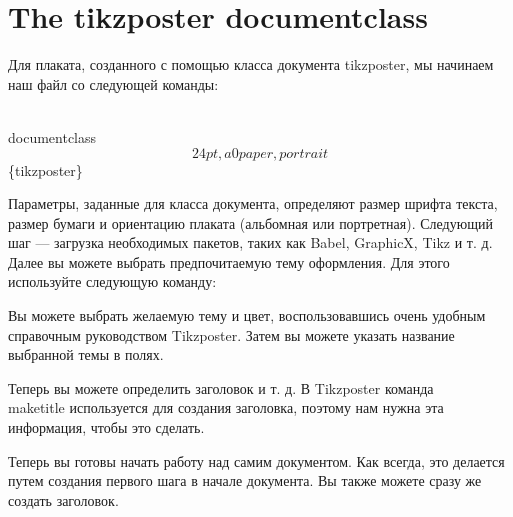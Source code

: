 \documentclass{article}
\begin{document}
  \section{The tikzposter documentclass}
  \label{sec:tikzposter}

  Для плаката, созданного с помощью класса документа tikzposter, мы начинаем наш файл со следующей команды:

  \\documentclass\[24pt, a0paper, portrait\]\{tikzposter\}


  Параметры, заданные для класса документа, определяют размер шрифта текста, размер бумаги и ориентацию плаката (альбомная или портретная).
Следующий шаг — загрузка необходимых пакетов, таких как Babel, GraphicX, Tikz и т. д.
Далее вы можете выбрать предпочитаемую тему оформления. Для этого используйте следующую команду:


Вы можете выбрать желаемую тему и цвет, воспользовавшись очень удобным справочным руководством Tikzposter.
Затем вы можете указать название выбранной темы в полях.

Теперь вы можете определить заголовок и т. д.
В Tikzposter команда \\maketitle используется для создания заголовка, поэтому нам нужна эта информация, чтобы это сделать.

Теперь вы готовы начать работу над самим документом. Как всегда, это делается путем создания первого шага в начале документа. Вы также можете сразу же создать заголовок.
\end{document}

